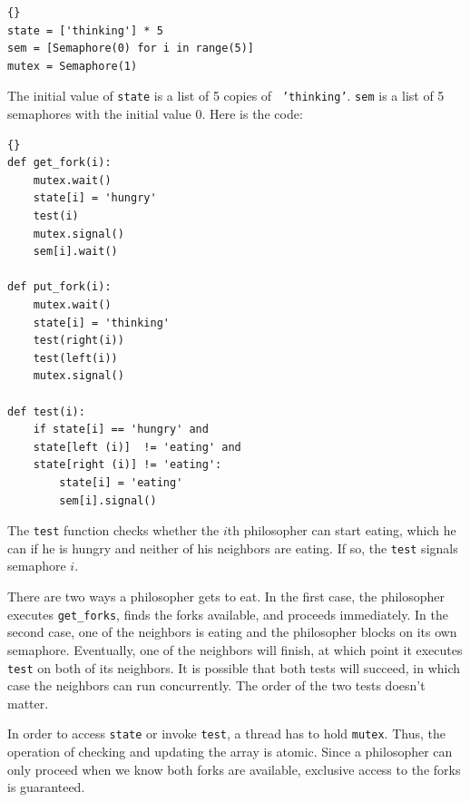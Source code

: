 \documentclass{book}
\begin{document}
\begin{latin}
\begin{latin}
\begin{lstlisting}[title={Variables for Tanenbaum's solution}]{}
state = ['thinking'] * 5
sem = [Semaphore(0) for i in range(5)]
mutex = Semaphore(1)
\end{lstlisting}
\end{latin}
\end{latin}

The initial value of {\tt state} is a list of 5 copies of {\tt
'thinking'}.  {\tt sem} is a list of 5 semaphores with the initial
value 0.  Here is the code:

\begin{latin}
\begin{latin}
\begin{lstlisting}[title={Tanenbaum's solution}]{}
def get_fork(i):
    mutex.wait()
    state[i] = 'hungry'
    test(i)
    mutex.signal()
    sem[i].wait()

def put_fork(i):
    mutex.wait()
    state[i] = 'thinking'
    test(right(i))
    test(left(i))
    mutex.signal()

def test(i):
    if state[i] == 'hungry' and
    state[left (i)]  != 'eating' and
    state[right (i)] != 'eating':
        state[i] = 'eating'
        sem[i].signal()
\end{lstlisting}
\end{latin}
\end{latin}


The {\tt test} function checks whether the $i$th philosopher can
start eating, which he can if he is hungry and
neither of his neighbors are eating.  If so, the {\tt test} signals
semaphore $i$.

There are two ways a philosopher gets to eat.  In the first case, the
philosopher executes {\tt get\_forks}, finds the forks available, and
proceeds immediately.  In the second case, one of the neighbors is
eating and the philosopher blocks on its own semaphore.  Eventually,
one of the neighbors will finish, at which point it executes {\tt
test} on both of its neighbors.  It is possible that both tests
will succeed, in which case the neighbors can run concurrently.
The order of the two tests doesn't matter.

In order to access {\tt state} or invoke {\tt test}, a thread
has to hold {\tt mutex}.  Thus, the operation of checking and
updating the array is atomic.  Since a philosopher can only proceed
when we know both forks are available, exclusive access to the forks
is guaranteed.
\end{document}
